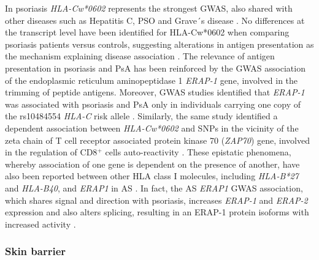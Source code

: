 In psoriasis \textit{HLA-Cw*0602} represents the strongest GWAS, also shared with other diseases such as Hepatitis C, PSO and Grave´s disease \parencite{Blais2011}. No differences at the transcript level have been identified for HLA-Cw*0602 when comparing psoriasis patients versus controls, suggesting alterations in antigen presentation as the mechanism explaining disease association \parencite{Hundhausen2012}. The relevance of antigen presentation in psoriasis and PsA has been reinforced by the GWAS association of the endoplasmic reticulum aminopeptidase 1 \textit{ERAP-1} gene, involved in the trimming of peptide antigens. Moreover, GWAS studies identified that \textit{ERAP-1} was associated with psoriasis and PsA only in individuals carrying one copy of the rs10484554 \textit{HLA-C} risk allele \parencite{Strange2010}. Similarly, the same study identified a dependent association between \textit{HLA-Cw*0602} and SNPs in the vicinity of the zeta chain of T cell receptor associated protein kinase 70 (\textit{ZAP70}) gene, involved in the regulation of CD8$^+$ cells auto-reactivity \parencite{Picard2009}. These epistatic phenomena, whereby association of one gene is dependent on the presence of another, have also been reported between other HLA class I molecules, including \textit{HLA-B*27} and \textit{HLA-B40}, and \textit{ERAP1} in AS \parencite{Evans2011, Cortes2015b}. In fact, the AS \textit{ERAP1} GWAS association, which shares signal and direction with psoriasis, increases \textit{ERAP-1} and \textit{ERAP-2} expression and also alters splicing, resulting in an ERAP-1 protein isoforms with increased activity \parencite{Constatino2015, Hanson2018}.

\subsubsection*{Skin barrier}

